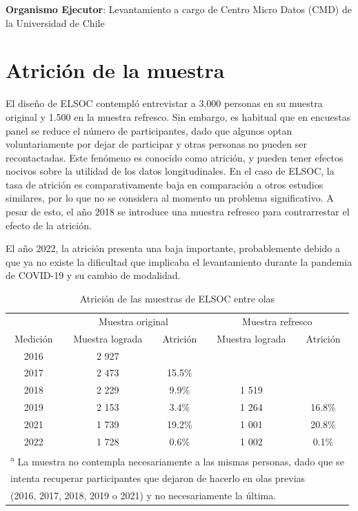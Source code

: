 \documentclass[
  12pt,
]{book}
\begin{document}
\textbf{Organismo Ejecutor}: Levantamiento a cargo de Centro Micro Datos (CMD) de la Universidad de Chile

\hypertarget{atriciuxf3n-de-la-muestra}{%
\section{Atrición de la muestra}\label{atriciuxf3n-de-la-muestra}}

El diseño de ELSOC contempló entrevistar a 3.000 personas en su muestra original y 1.500 en la muestra refresco. Sin embargo, es habitual que en encuestas panel se reduce el número de participantes, dado que algunos optan voluntariamente por dejar de participar y otras personas no pueden ser recontactadas. Este fenómeno es conocido como atrición, y pueden tener efectos nocivos sobre la utilidad de los datos longitudinales. En el caso de ELSOC, la tasa de atrición es comparativamente baja en comparación a otros estudios similares, por lo que no se considera al momento un problema significativo. A pesar de esto, el año 2018 se introduce una muestra refresco para contrarrestar el efecto de la atrición.

El año 2022, la atrición presenta una baja importante, probablemente debido a que ya no existe la dificultad que implicaba el levantamiento durante la pandemia de COVID-19 y su cambio de modalidad.

\begin{table}

\caption{\label{tab:tabla-atricion}Atrición de las muestras de ELSOC entre olas}
\centering
\begin{tabular}[t]{c|c|c|c|c}
\hline
\multicolumn{1}{c|}{ } & \multicolumn{2}{c|}{Muestra original} & \multicolumn{2}{c}{Muestra refresco} \\
\cline{2-3} \cline{4-5}
Medición & Muestra lograda & Atrición & Muestra lograda & Atrición\\
\hline
2016 & 2 927 &  &  & \\
\hline
2017 & 2 473 & 15.5\% &  & \\
\hline
2018 & 2 229 & 9.9\% & 1 519 & \\
\hline
2019 & 2 153 & 3.4\% & 1 264 & 16.8\%\\
\hline
2021 & 1 739 & 19.2\% & 1 001 & 20.8\%\\
\hline
2022 & 1 728 & 0.6\% & 1 002 & 0.1\%\\
\hline
\multicolumn{5}{l}{\textsuperscript{a} La muestra no contempla necesariamente a las mismas personas, dado que se}\\
\multicolumn{5}{l}{intenta recuperar participantes que dejaron de hacerlo en olas previas}\\
\multicolumn{5}{l}{(2016, 2017, 2018, 2019 o 2021) y no necesariamente la última.}\\
\end{tabular}
\end{table}
\end{document}
